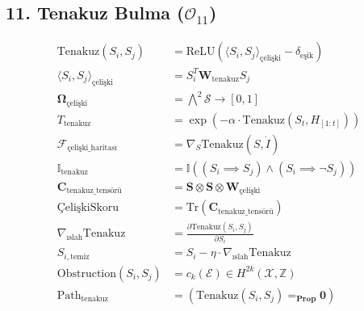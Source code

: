 \documentclass[11pt, a4paper]{article}
\begin{document}
\subsection{11. Tenakuz Bulma ($\mathcal{O}_{11}$)}
\begin{align}
\text{Tenakuz}(S_i, S_j) &= \text{ReLU}\left( \langle S_i, S_j \rangle_{\text{çelişki}} - \delta_{\text{eşik}} \right) \\
\langle S_i, S_j \rangle_{\text{çelişki}} &= S_i^T \mathbf{W}_{\text{tenakuz}} S_j \\
\mathbf{\Omega}_{\text{çelişki}} &= \bigwedge^2 \mathcal{S} \to [0, 1] \\
T_{\text{tenakuz}} &= \exp\left( -\alpha \cdot \text{Tenakuz}(S_t, H_{[1:t]}) \right) \\
\mathcal{F}_{\text{çelişki\_haritası}} &= \nabla_S \text{Tenakuz}(S, \dot{I}) \\
\mathbb{I}_{\text{tenakuz}} &= \mathbb{I}\left( (S_i \implies S_j) \land (S_i \implies \neg S_j) \right) \\
\mathbf{C}_{\text{tenakuz\_tensörü}} &= \mathbf{S} \otimes \mathbf{S} \otimes \mathbf{W}_{\text{çelişki}} \\
\text{ÇelişkiSkoru} &= \text{Tr}(\mathbf{C}_{\text{tenakuz\_tensörü}}) \\
\nabla_{\text{ıslah}} \text{Tenakuz} &= \frac{\partial \text{Tenakuz}(S_i, S_j)}{\partial S_i} \\
S_{i, \text{temiz}} &= S_i - \eta \cdot \nabla_{\text{ıslah}} \text{Tenakuz} \\
\text{Obstruction}(S_i, S_j) &= c_k(\mathcal{E}) \in H^{2k}(\mathcal{X}, \mathbb{Z}) \\
\text{Path}_{\text{tenakuz}} &= (\text{Tenakuz}(S_i, S_j) =_{\mathbf{Prop}} \mathbf{0})
\end{align}
\end{document}
